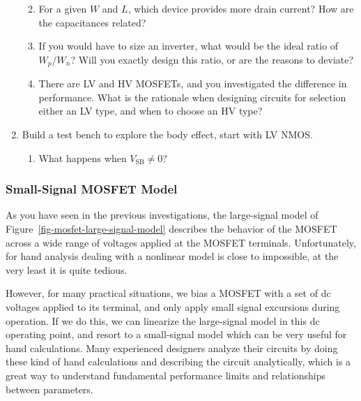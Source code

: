\documentclass[
  a4paper,
  DIV=11,
  numbers=noendperiod]{scrartcl}
\providecommand{\tightlist}{%
  \setlength{\itemsep}{0pt}\setlength{\parskip}{0pt}}\usepackage{longtable,booktabs,array}
\begin{document}
\begin{tcolorbox}
\begin{enumerate}
  \begin{enumerate}
  \def\labelenumii{\arabic{enumii}.}
  \tightlist
  \item
    For a given \(W\) and \(L\), which device provides more drain
    current? How are the capacitances related?
  \item
    If you would have to size an inverter, what would be the ideal ratio
    of \(W_p/W_n\)? Will you exactly design this ratio, or are the
    reasons to deviate?
  \item
    There are LV and HV MOSFETs, and you investigated the difference in
    performance. What is the rationale when designing circuits for
    selection either an LV type, and when to choose an HV type?
  \end{enumerate}
\item
  Build a test bench to explore the body effect, start with LV NMOS.

  \begin{enumerate}
  \def\labelenumii{\arabic{enumii}.}
  \tightlist
  \item
    What happens when \(V_\mathrm{SB}\neq 0\)?
  \end{enumerate}
\end{enumerate}

\end{tcolorbox}

\subsubsection{Small-Signal MOSFET
Model}\label{sec-mosfet-smallsignal-model}

As you have seen in the previous investigations, the large-signal model
of Figure~\ref{fig-mosfet-large-signal-model} describes the behavior of
the MOSFET across a wide range of voltages applied at the MOSFET
terminals. Unfortunately, for hand analysis dealing with a nonlinear
model is close to impossible, at the very least it is quite tedious.

However, for many practical situations, we bias a MOSFET with a set of
dc voltages applied to its terminal, and only apply small signal
excursions during operation. If we do this, we can linearize the
large-signal model in this dc operating point, and resort to a
small-signal model which can be very useful for hand calculations. Many
experienced designers analyze their circuits by doing these kind of hand
calculations and describing the circuit analytically, which is a great
way to understand fundamental performance limits and relationships
between parameters.
\end{document}
